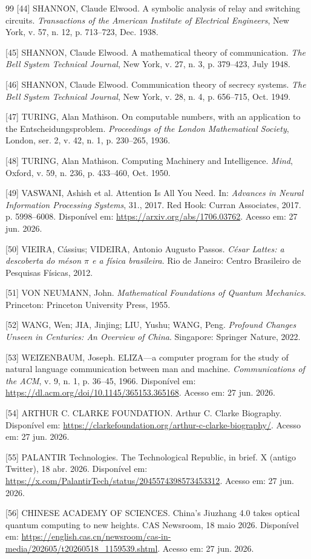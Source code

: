 \documentclass{hipatia}
\begin{document}
{\begin{thebibliography}{99}
[44]
SHANNON, Claude Elwood.
A symbolic analysis of relay and switching circuits.
\textit{Transactions of the American Institute of Electrical Engineers},
New York,
v. 57,
n. 12,
p. 713--723,
Dec. 1938.

[45]
SHANNON, Claude Elwood.
A mathematical theory of communication.
\textit{The Bell System Technical Journal},
New York,
v. 27,
n. 3,
p. 379--423,
July 1948.

[46]
SHANNON, Claude Elwood.
Communication theory of secrecy systems.
\textit{The Bell System Technical Journal},
New York,
v. 28,
n. 4,
p. 656--715,
Oct. 1949.

[47]
TURING, Alan Mathison.
On computable numbers, with an application to the Entscheidungsproblem.
\textit{Proceedings of the London Mathematical Society},
London,
ser. 2,
v. 42,
n. 1,
p. 230--265,
1936.

[48]
TURING, Alan Mathison.
Computing Machinery and Intelligence.
\textit{Mind},
Oxford,
v. 59,
n. 236,
p. 433--460,
Oct. 1950.

[49]
VASWANI, Ashish et al.
Attention Is All You Need.
In: \textit{Advances in Neural Information Processing Systems},
31., 2017.
Red Hook: Curran Associates, 2017.
p. 5998--6008.
Disponível em:
\url{https://arxiv.org/abs/1706.03762}.
Acesso em: 27 jun. 2026.

[50]
VIEIRA, Cássius; VIDEIRA, Antonio Augusto Passos.
\textit{César Lattes: a descoberta do méson $\pi$ e a física brasileira}.
Rio de Janeiro:
Centro Brasileiro de Pesquisas Físicas,
2012.

[51]
VON NEUMANN, John.
\textit{Mathematical Foundations of Quantum Mechanics}.
Princeton:
Princeton University Press,
1955.

[52]
WANG, Wen;
JIA, Jinjing;
LIU, Yushu;
WANG, Peng.
\textit{Profound Changes Unseen in Centuries: An Overview of China}.
Singapore:
Springer Nature,
2022.

[53]
WEIZENBAUM, Joseph.
ELIZA---a computer program for the study of natural language communication between man and machine.
\textit{Communications of the ACM},
v. 9,
n. 1,
p. 36--45,
1966.
Disponível em:
\url{https://dl.acm.org/doi/10.1145/365153.365168}.
Acesso em: 27 jun. 2026.


[54]
ARTHUR C. CLARKE FOUNDATION.
Arthur C. Clarke Biography.
Disponível em:
\url{https://clarkefoundation.org/arthur-c-clarke-biography/}.
Acesso em: 27 jun. 2026.

[55]
PALANTIR Technologies.
The Technological Republic, in brief.
X (antigo Twitter),
18 abr. 2026.
Disponível em:
\url{https://x.com/PalantirTech/status/2045574398573453312}.
Acesso em: 27 jun. 2026.

[56]
CHINESE ACADEMY OF SCIENCES.
China's Jiuzhang 4.0 takes optical quantum computing to new heights.
CAS Newsroom,
18 maio 2026.
Disponível em:
\url{https://english.cas.cn/newsroom/cas-in-media/202605/t20260518_1159539.shtml}.
Acesso em: 27 jun. 2026.

\end{thebibliography}	
}
\end{document}
